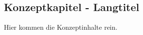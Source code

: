 \begin{showConcept}%
%
\chapter[Konzeptkapitel - Kurztitel für Inhaltsverzeichnis und Kolumnentitel]{Konzeptkapitel - Langtitel}%
\label{chap:Konzept}
%
Hier kommen die Konzeptinhalte rein.
%
%
\end{showConcept}%